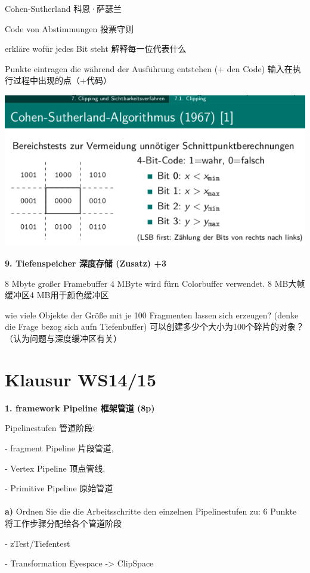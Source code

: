 \documentclass[fleqn]{article}
\begin{document}
Cohen-Sutherland 科恩·萨瑟兰

Code von Abstimmungen 投票守则

erkläre wofür jedes Bit steht 解释每一位代表什么

Punkte eintragen die während der Ausführung entstehen (+ den Code) 输入在执行过程中出现的点（+代码）

\begin{center}
    \includegraphics[scale=0.6]{5.png}
\end{center}

\noindent\textbf{9. Tiefenspeicher 深度存储 (Zusatz) +3}

8 Mbyte großer Framebuffer 4 MByte wird fürn Colorbuffer verwendet. 8 MB大帧缓冲区4 MB用于颜色缓冲区 

wie viele Objekte der Größe mit je 100 Fragmenten lassen sich erzeugen? (denke die Frage bezog sich aufn Tiefenbuffer) 可以创建多少个大小为100个碎片的对象？ （认为​​问题与深度缓冲区有关）

\section{Klausur WS14/15}

\noindent\textbf{1. framework Pipeline 框架管道 (8p)}

Pipelinestufen 管道阶段:

- fragment Pipeline 片段管道,

- Vertex Pipeline 顶点管线,

- Primitive Pipeline 原始管道
\\
\\
\indent\textbf{a)} Ordnen Sie die die Arbeitsschritte den einzelnen Pipelinestufen zu: 6 Punkte
将工作步骤分配给各个管道阶段

- zTest/Tiefentest

- Transformation Eyespace -> ClipSpace
\end{document}
